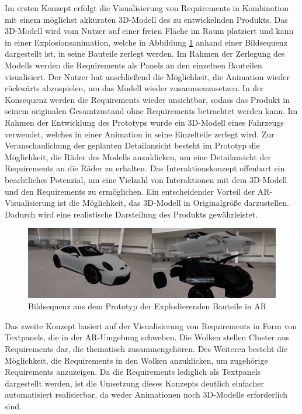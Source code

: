 Im ersten Konzept erfolgt die Visualisierung von Requirements in Kombination mit einem möglichst akkuraten 3D-Modell des zu entwickelnden Produkts.
Das 3D-Modell wird vom Nutzer auf einer freien Fläche im Raum platziert und kann in einer Explosionsanimation, welche in Abbildung \ref{fig:porsche-explosion-ar} anhand einer Bildsequenz dargestellt ist, in seine Bauteile zerlegt werden.
Im Rahmen der Zerlegung des Modells werden die Requirements als Panels an den einzelnen Bauteilen visualisiert.
Der Nutzer hat anschließend die Möglichkeit, die Animation wieder rückwärts abzuspielen, um das Modell wieder zusammenzusetzen.
In der Konsequenz werden die Requirements wieder unsichtbar, sodass das Produkt in seinem originalen Gesamtzustand ohne Requirements betrachtet werden kann.
Im Rahmen der Entwicklung des Prototyps wurde ein 3D-Modell eines Fahrzeugs verwendet, welches in einer Animation in seine Einzelteile zerlegt wird.
Zur Veranschaulichung der geplanten Detailansicht besteht im Prototyp die Möglichkeit, die Räder des Modells anzuklicken, um eine Detailansicht der Requirements an die Räder zu erhalten.
Das Interaktionskonzept offenbart ein beachtliches Potenzial, um eine Vielzahl von Interaktionen mit dem 3D-Modell und den Requirements zu ermöglichen.
Ein entscheidender Vorteil der AR-Visualisierung ist die Möglichkeit, das 3D-Modell in Originalgröße darzustellen.
Dadurch wird eine realistische Darstellung des Produkts gewährleistet.

\begin{figure}[H]
    \centering
    \includegraphics[width=1\textwidth]{images/PorscheExplosionAR.png}
    \caption{Bildsequenz aus dem Prototyp der Explodierenden Bauteile in AR}
    \label{fig:porsche-explosion-ar}
\end{figure}
 
Das zweite Konzept basiert auf der Visualisierung von Requirements in Form von Textpanels, die in der AR-Umgebung schweben.
Die Wolken stellen Cluster aus Requirements dar, die thematisch zusammengehören.
Des Weiteren besteht die Möglichkeit, die Requirements in den Wolken anzuklicken, um zugehörige Requirements anzuzeigen.
Da die Requirements lediglich als Textpanels dargestellt werden, ist die Umsetzung dieses Konzepts deutlich einfacher automatisiert realisierbar, da weder Animationen noch 3D-Modelle erforderlich sind.

